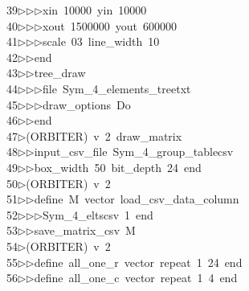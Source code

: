 \begin{tabbing}
39\>$\triangleright$\>$\triangleright$\>$\triangleright$\>xin\ 10000\ yin\ 10000\ \\[0pt]
40\>$\triangleright$\>$\triangleright$\>$\triangleright$\>xout\ 1500000\ yout\ 600000\ \\[0pt]
41\>$\triangleright$\>$\triangleright$\>$\triangleright$\>scale\ 03\ line\_width\ 10\ \\[0pt]
42\>$\triangleright$\>$\triangleright$\>end\ \\[0pt]
43\>$\triangleright$\>$\triangleright$\>tree\_draw\ \\[0pt]
44\>$\triangleright$\>$\triangleright$\>$\triangleright$\>file\ Sym\_4\_elements\_treetxt\ \\[0pt]
45\>$\triangleright$\>$\triangleright$\>$\triangleright$\>draw\_options\ Do\ \\[0pt]
46\>$\triangleright$\>$\triangleright$\>end\\[0pt]
47\>$\triangleright$\>(ORBITER)\ v\ 2\ draw\_matrix\ \\[0pt]
48\>$\triangleright$\>$\triangleright$\>input\_csv\_file\ Sym\_4\_group\_tablecsv\ \\[0pt]
49\>$\triangleright$\>$\triangleright$\>box\_width\ 50\ bit\_depth\ 24\ end\\[0pt]
50\>$\triangleright$\>(ORBITER)\ v\ 2\ \\[0pt]
51\>$\triangleright$\>$\triangleright$\>define\ M\ vector\ load\_csv\_data\_column\ \\[0pt]
52\>$\triangleright$\>$\triangleright$\>$\triangleright$\>Sym\_4\_eltscsv\ 1\ end\ \\[0pt]
53\>$\triangleright$\>$\triangleright$\>save\_matrix\_csv\ M\ \\[0pt]
54\>$\triangleright$\>(ORBITER)\ v\ 2\ \\[0pt]
55\>$\triangleright$\>$\triangleright$\>define\ all\_one\_r\ vector\ repeat\ 1\ 24\ end\ \\[0pt]
56\>$\triangleright$\>$\triangleright$\>define\ all\_one\_c\ vector\ repeat\ 1\ 4\ end\ \\[0pt]

\end{tabbing}
